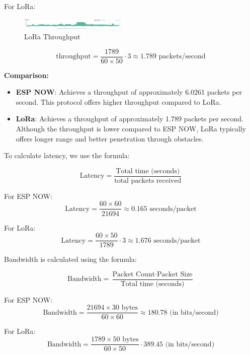 For LoRa:
\begin{figure}[H]
  \begin{center}
    \includegraphics[width=0.45\textwidth]{./Figures/elk/lora.png}
  \end{center}
  \caption{LoRa Throughput}\label{fig:lorathroughput}
\end{figure}
\[
\text{throughput} = \frac{1789}{60 \times 50} \cdot 3 \approx 1.789 \text{ packets/second}
\]

\textbf{Comparison:}

\begin{itemize}
  \item \textbf{ESP NOW}: Achieves a throughput of approximately 6.0261 packets per second. This protocol offers higher throughput compared to LoRa.
  
  \item \textbf{LoRa}: Achieves a throughput of approximately 1.789 packets per second. Although the throughput is lower compared to ESP NOW, LoRa typically offers longer range and better penetration through obstacles.
\end{itemize}

To calculate latency, we use the formula:

\[
\text{Latency} = \frac{\text{Total time (seconds)}}{\text{total packets received}}
\]

For ESP NOW:
\[
\text{Latency} = \frac{60 \times 60}{21694} \approx 0.165 \text{ seconds/packet}
\]

For LoRa:
\[
\text{Latency} = \frac{60 \times 50}{1789} \cdot 3 \approx 1.676 \text{ seconds/packet}
\]

Bandwidth is calculated using the formula:

\[
\text{Bandwidth} = \frac{\text{Packet Count} \cdot \text{Packet Size}}{\text{Total time (seconds)}}
\]

For ESP NOW:
\[
\text{Bandwidth} = \frac{21694 \times 30 \text{ bytes}}{60 \times 60} \approx 180.78 \text{ (in bits/second)}
\]

For LoRa:
\[
\text{Bandwidth} = \frac{1789 \times 50 \text{ bytes}}{60 \times 50} \cdot 3 89.45 \text{ (in bits/second)}
\]

